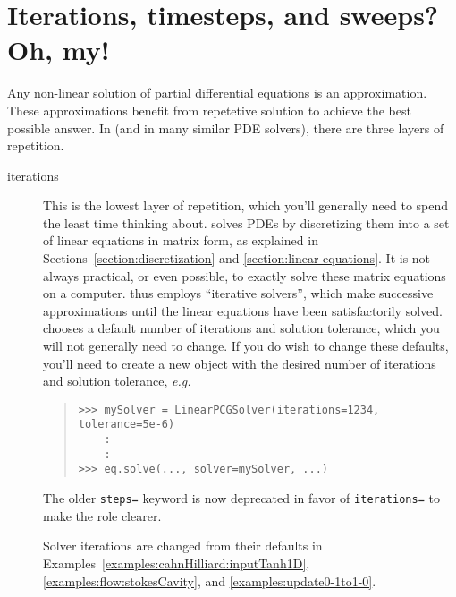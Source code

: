     \section{Iterations, timesteps, and sweeps? Oh, my!} 
    \label{FAQ-IterationsTimestepsSweeps}
    Any non-linear solution of partial differential equations is an
    approximation. These approximations benefit from repetetive
    solution to achieve the best possible answer. In \FiPy{} (and in
    many similar PDE solvers), there are three layers of repetition.
    
    \begin{description}
    
        \item[iterations] This is the lowest layer of repetition,
        which you'll generally need to spend the least time thinking
        about. \FiPy{} solves PDEs by discretizing them into a set of
        linear equations in matrix form, as explained in
        Sections~\ref{section:discretization} and
        \ref{section:linear-equations}. It is not always practical, or
        even possible, to exactly solve these matrix equations on a
        computer. \FiPy{} thus employs ``iterative solvers'', which
        make successive approximations until the linear equations have
        been satisfactorily solved. \FiPy{} chooses a default number
        of iterations and solution tolerance, which you will not
        generally need to change. If you do wish to change these
        defaults, you'll need to create a new  object
        with the desired number of iterations and solution tolerance,
        \emph{e.g.}
        \begin{quote}
\begin{verbatim}
>>> mySolver = LinearPCGSolver(iterations=1234, tolerance=5e-6) 
    : 
    :
>>> eq.solve(..., solver=mySolver, ...)
\end{verbatim}
    	\end{quote}
        \begin{reSTadmonition}[Note]
        The older  \verb+steps=+ keyword is now
        deprecated in favor of \verb+iterations=+ to make the role
        clearer.
        \end{reSTadmonition}
        Solver iterations are changed from their defaults in
        Examples~\ref{examples:cahnHilliard:inputTanh1D},
        \ref{examples:flow:stokesCavity}, and
        \ref{examples:update0-1to1-0}.
        

\end{description}
